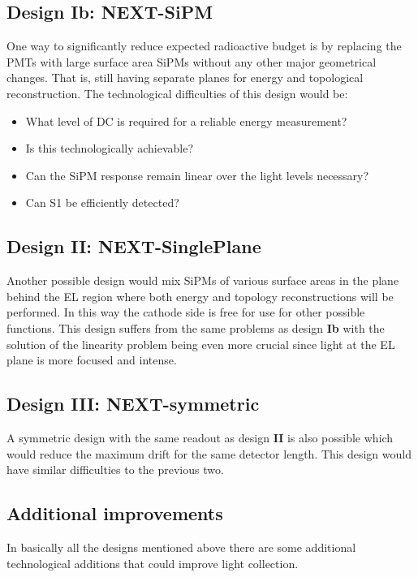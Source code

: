 \documentclass[11pt,a4paper]{article}
\begin{document}
\subsection{Design Ib: NEXT-SiPM}
\label{subSec:desib}
One way to significantly reduce expected radioactive budget is by replacing the PMTs with large surface area SiPMs without any other major geometrical changes. That is, still having separate planes for energy and topological reconstruction. The technological difficulties of this design would be:
\begin{itemize}
\item What level of DC is required for a reliable energy measurement?
\item Is this technologically achievable?
\item Can the SiPM response remain linear over the light levels necessary?
\item Can S1 be efficiently detected?
\end{itemize}

\subsection{Design II: NEXT-SinglePlane}
\label{subSec:desii}
Another possible design would mix SiPMs of various surface areas in the plane behind the EL region where both energy and topology reconstructions will be performed. In this way the cathode side is free for use for other possible functions. This design suffers from the same problems as design {\bf Ib} with the solution of the linearity problem being even more crucial since light at the EL plane is more focused and intense.

\subsection{Design III: NEXT-symmetric}
\label{subSec:desiii}
A symmetric design with the same readout as design {\bf II} is also possible which would reduce the maximum drift for the same detector length. This design would have similar difficulties to the previous two.

\subsection{Additional improvements}
\label{subSec:desadd}
In basically all the designs mentioned above there are some additional technological additions that could improve light collection.
\end{document}
